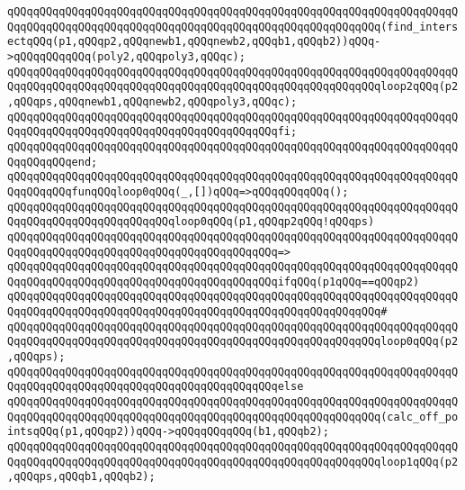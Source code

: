 \verb|qQQqqQQqqQQqqQQqqQQqqQQqqQQqqQQqqQQqqQQqqQQqqQQqqQQqqQQqqQQqqQQqqQQqqQQqqQQqqQQqqQQqqQQqqQQqqQQqqQQqqQQqqQQqqQQqqQQqqQQqqQQqqQQq(find_intersectqQQq(p1,qQQqp2,qQQqnewb1,qQQqnewb2,qQQqb1,qQQqb2))qQQq->qQQqqQQqqQQq(poly2,qQQqpoly3,qQQqc);|\newline
\newline
\verb|qQQqqQQqqQQqqQQqqQQqqQQqqQQqqQQqqQQqqQQqqQQqqQQqqQQqqQQqqQQqqQQqqQQqqQQqqQQqqQQqqQQqqQQqqQQqqQQqqQQqqQQqqQQqqQQqqQQqqQQqqQQqqQQqloop2qQQq(p2,qQQqps,qQQqnewb1,qQQqnewb2,qQQqpoly3,qQQqc);|\newline
\verb|qQQqqQQqqQQqqQQqqQQqqQQqqQQqqQQqqQQqqQQqqQQqqQQqqQQqqQQqqQQqqQQqqQQqqQQqqQQqqQQqqQQqqQQqqQQqqQQqqQQqqQQqqQQqqQQqfi;|\newline
\verb|qQQqqQQqqQQqqQQqqQQqqQQqqQQqqQQqqQQqqQQqqQQqqQQqqQQqqQQqqQQqqQQqqQQqqQQqqQQqqQQqend;|\newline
\newline
\verb|qQQqqQQqqQQqqQQqqQQqqQQqqQQqqQQqqQQqqQQqqQQqqQQqqQQqqQQqqQQqqQQqqQQqqQQqqQQqqQQqfunqQQqloop0qQQq(_,[])qQQq=>qQQqqQQqqQQq();|\newline
\verb|qQQqqQQqqQQqqQQqqQQqqQQqqQQqqQQqqQQqqQQqqQQqqQQqqQQqqQQqqQQqqQQqqQQqqQQqqQQqqQQqqQQqqQQqqQQqqQQqloop0qQQq(p1,qQQqp2qQQq!qQQqps)|\newline
\verb|qQQqqQQqqQQqqQQqqQQqqQQqqQQqqQQqqQQqqQQqqQQqqQQqqQQqqQQqqQQqqQQqqQQqqQQqqQQqqQQqqQQqqQQqqQQqqQQqqQQqqQQqqQQqqQQq=>|\newline
\verb|qQQqqQQqqQQqqQQqqQQqqQQqqQQqqQQqqQQqqQQqqQQqqQQqqQQqqQQqqQQqqQQqqQQqqQQqqQQqqQQqqQQqqQQqqQQqqQQqqQQqqQQqqQQqqQQqifqQQq(p1qQQq==qQQqp2)|\newline
\verb|qQQqqQQqqQQqqQQqqQQqqQQqqQQqqQQqqQQqqQQqqQQqqQQqqQQqqQQqqQQqqQQqqQQqqQQqqQQqqQQqqQQqqQQqqQQqqQQqqQQqqQQqqQQqqQQqqQQqqQQqqQQqqQQq#|\newline
\verb|qQQqqQQqqQQqqQQqqQQqqQQqqQQqqQQqqQQqqQQqqQQqqQQqqQQqqQQqqQQqqQQqqQQqqQQqqQQqqQQqqQQqqQQqqQQqqQQqqQQqqQQqqQQqqQQqqQQqqQQqqQQqqQQqloop0qQQq(p2,qQQqps);|\newline
\verb|qQQqqQQqqQQqqQQqqQQqqQQqqQQqqQQqqQQqqQQqqQQqqQQqqQQqqQQqqQQqqQQqqQQqqQQqqQQqqQQqqQQqqQQqqQQqqQQqqQQqqQQqqQQqqQQqelse|\newline
\verb|qQQqqQQqqQQqqQQqqQQqqQQqqQQqqQQqqQQqqQQqqQQqqQQqqQQqqQQqqQQqqQQqqQQqqQQqqQQqqQQqqQQqqQQqqQQqqQQqqQQqqQQqqQQqqQQqqQQqqQQqqQQqqQQq(calc_off_pointsqQQq(p1,qQQqp2))qQQq->qQQqqQQqqQQq(b1,qQQqb2);|\newline
\newline
\verb|qQQqqQQqqQQqqQQqqQQqqQQqqQQqqQQqqQQqqQQqqQQqqQQqqQQqqQQqqQQqqQQqqQQqqQQqqQQqqQQqqQQqqQQqqQQqqQQqqQQqqQQqqQQqqQQqqQQqqQQqqQQqqQQqloop1qQQq(p2,qQQqps,qQQqb1,qQQqb2);|\newline
